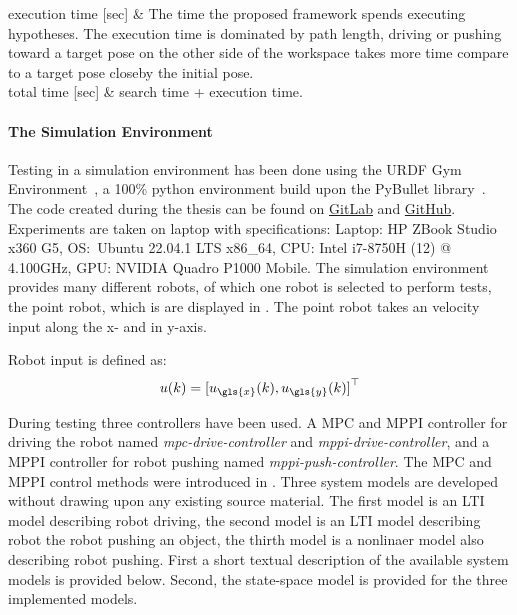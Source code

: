 \begin{table}[H]
\begin{tabular}
execution time [sec] & The time the proposed framework spends executing hypotheses. The execution time is dominated by path length, driving or pushing toward a target pose on the other side of the workspace takes more time compare to a target pose closeby the initial pose.\\ 
total time [sec] & search time + execution time.\\
\end{tabular}
\end{table}

\paragraph{The Simulation Environment}
Testing in a simulation environment has been done using the URDF Gym Environment~\cite{spahn_urdfenvironment_2022}, a 100\% python environment build upon the PyBullet library~\cite{coumans_pybullet_2016}. The code created during the thesis can be found on \href{https://gitlab.tudelft.nl/airlab-delft/msc_projects/msc_gijs_groote}{GitLab} and \href{https://github.com/GijsGroote/semantic-thinking-robot}{GitHub}. Experiments are taken on laptop with specifications: Laptop: HP ZBook Studio x360 G5, OS:~Ubuntu 22.04.1 LTS x86\_64, CPU: Intel i7-8750H (12) @ 4.100GHz, GPU: NVIDIA Quadro P1000 Mobile. The simulation environment provides many different robots, of which one robot is selected to perform tests, the point robot, which is are displayed in . The point robot takes an velocity input along the \gls{x}- and in \gls{y}-axis.\bs

Robot input is defined as:\\
\[ u(k) = {[ u_{\gls{x}}(k), u_{\gls{y}}(k) ]}^\top \]

During testing three controllers have been used. A \ac{MPC} and \ac{MPPI} controller for driving the robot named \textit{mpc-drive-controller} and \textit{mppi-drive-controller}, and a \ac{MPPI} controller for robot pushing named \textit{mppi-push-controller}. The \ac{MPC} and \ac{MPPI} control methods were introduced in . Three system models are developed without drawing upon any existing source material. The first model is an \ac{LTI} model describing robot driving, the second model is an \ac{LTI} model describing robot the robot pushing an object, the thirth model is a nonlinaer model also describing robot pushing. First a short textual description of the available system models is provided below. Second, the state-space model is provided for the three implemented models.\bs

